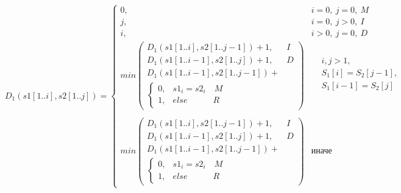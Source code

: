 \begin{equation}
\label{eq:damerau}
D_1(s1[1..i], s2[1..j]) = 
    \begin{cases}
        0, & i=0,\ j=0,\ M \\
        
        j, & i=0,\ j>0,\ I \\
        
        i, & i>0,\ j=0,\ D \\
        
        min\begin{pmatrix}
            D_1(s1[1..i], s2[1..j-1]) + 1, & I \\
            
            D_1(s1[1..i-1], s2[1..j]) + 1, & D \\
            
            D_1(s1[1..i-1], s2[1..j-1]) + \\ %
            
            \begin{cases}
                0, & s1_i = s2_i \quad M \\
                
                1, & else \quad\qquad R
            \end{cases}
        \end{pmatrix} & \begin{aligned}
            &i, j > 1, \\ 
            &S_1[i] = S_2[j - 1], \\
            &S_1[i - 1] = S_2[j]\\
        \end{aligned} \\

\\

        min\begin{pmatrix}
            D_1(s1[1..i], s2[1..j-1]) + 1, & I \\
            
            D_1(s1[1..i-1], s2[1..j]) + 1, & D \\
            
            D_1(s1[1..i-1], s2[1..j-1]) + \\ %
            
            \begin{cases}
                0, & s1_i = s2_i \quad M \\
                
                1, & else \quad\qquad R
            \end{cases}
        \end{pmatrix} & \text{иначе}
    \end{cases}
\end{equation}

